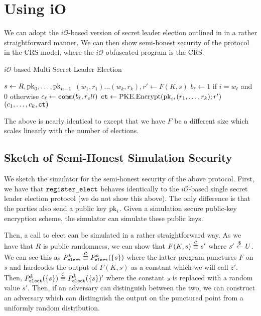 \newcommand{\iO}{i\mathcal{O}}
\section{Using iO}
We can adopt the $\iO$-based version of secret leader election outlined in \cite{boneh2020single} in a rather straightforward manner.
We can then show semi-honest security of the protocol in the CRS model, where the $\iO$ obfuscated program is the CRS.


\begin{algorithm}
	\caption{$\iO$ based Multi Secret Leader Election}
	\label{alg:iOSSLE}
	\begin{algorithmic}[1]
		\State $s \gets R, \text{pk}_0, \dots, \text{pk}_{n - 1}$
		\State $(w_1, r_1) \dots (w_k, r_k), r' \gets F(K, s)$ %
		\State $b_\ell \gets 1$ if $i = w_\ell$ and $0$ otherwise
		\State $c_\ell \gets \texttt{comm}(b_\ell, r_ell)$
		\State $\texttt{ct} \gets \text{PKE.Encrypt}(\text{pk}_i, (r_1, \dots, r_k); r')$
		\State \Return $(c_1, \dots, c_k, \texttt{ct})$
		\EndFunction
	\end{algorithmic}
\end{algorithm}

The above is nearly identical to \cite{boneh2020single} except that we have $F$ be a different size which
scales linearly with the number of elections.

\subsection{Sketch of Semi-Honest Simulation Security}
We sketch the simulator for the semi-honest security of the above protocol. First, we have that $\texttt{register\_elect}$
behaves identically to the $\iO$-based single secret leader election protocol (we do not show this above).
The only difference is that the parties also send a public key $\text{pk}_i$. Given a simulation secure public-key encryption scheme,
the simulator can simulate these public keys.

Then, a call to elect can be simulated in a rather straightforward way. As we have that
$R$ is public randomness, we can show that $F(K, s) \compInd s'$ where $s' \overset{\$}{\gets} U$.
We can see this as $P^k_\elect \compInd P^k_\elect(\{s\})$ where the latter program punctures
$F$ on $s$ and hardcodes the output of $F(K, s)$ as a constant which we will call $z'$. Then, $P^k_\elect(\{s\}) \compInd P^k_\elect(\{s\})'$
where the constant $s$ is replaced with a random value $s'$.
Then, if an adversary can distinguish between the two, we can construct an adversary
which can distinguish the output on the punctured point from a uniformly random distribution.


